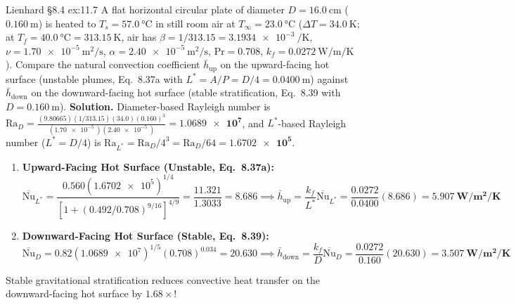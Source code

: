 \begin{workedexample}{Lienhard §8.4 }{ex:11.7}
A flat horizontal circular plate of diameter $D = \SI{16.0}{\centi\meter}$ ($\SI{0.160}{\meter}$) is heated to $T_s = \SI{57.0}{\celsius}$ in still room air at $T_\infty = \SI{23.0}{\celsius}$ ($\Delta T = \SI{34.0}{\kelvin}$; at $T_f = \SI{40.0}{\celsius} = \SI{313.15}{\kelvin}$, air has $\beta = 1/313.15 = \SI{3.1934e-3}{\per\kelvin}$, $\nu = \SI{1.70e-5}{\square\meter\per\second}$, $\alpha = \SI{2.40e-5}{\square\meter\per\second}$, $\mathrm{Pr} = 0.708$, $k_f = \SI{0.0272}{\watt\per\meter\per\kelvin}$). Compare the natural convection coefficient $\bar{h}_{\mathrm{up}}$ on the upward-facing hot surface (unstable plumes, Eq.~8.37a with $L^* = A/P = D/4 = \SI{0.0400}{\meter}$) against $\bar{h}_{\mathrm{down}}$ on the downward-facing hot surface (stable stratification, Eq.~8.39 with $D = \SI{0.160}{\meter}$).
\tcblower
\textbf{Solution.} Diameter-based Rayleigh number is $\mathrm{Ra}_D = \frac{(9.80665)(1/313.15)(34.0)(0.160)^3}{(\SI{1.70e-5}{})(\SI{2.40e-5}{})} = \mathbf{\num{1.0689e7}}$, and $L^*$-based Rayleigh number ($L^* = D/4$) is $\mathrm{Ra}_{L^*} = \mathrm{Ra}_D / 4^3 = \mathrm{Ra}_D / 64 = \mathbf{\num{1.6702e5}}$.
\begin{enumerate}
  \item \textbf{Upward-Facing Hot Surface (Unstable,  Eq.~8.37a):}
  \[
    \overline{\mathrm{Nu}}_{L^*} = \frac{0.560(\num{1.6702e5})^{1/4}}{\left[1 + (0.492/0.708)^{9/16}\right]^{4/9}} = \frac{11.321}{1.3033} = \mathbf{8.686} \implies
    \bar{h}_{\mathrm{up}} = \frac{k_f}{L^*}\overline{\mathrm{Nu}}_{L^*} = \frac{0.0272}{0.0400}(8.686) = \mathbf{\SI{5.907}{\watt\per\square\meter\per\kelvin}}
  \]
  \item \textbf{Downward-Facing Hot Surface (Stable,  Eq.~8.39):}
  \[
    \overline{\mathrm{Nu}}_D = 0.82(\num{1.0689e7})^{1/5}(0.708)^{0.034} = \mathbf{20.630} \implies
    \bar{h}_{\mathrm{down}} = \frac{k_f}{D}\overline{\mathrm{Nu}}_D = \frac{0.0272}{0.160}(20.630) = \mathbf{\SI{3.507}{\watt\per\square\meter\per\kelvin}}
  \]
\end{enumerate}
Stable gravitational stratification reduces convective heat transfer on the downward-facing hot surface by $\mathbf{1.68\times}$!
\end{workedexample}

